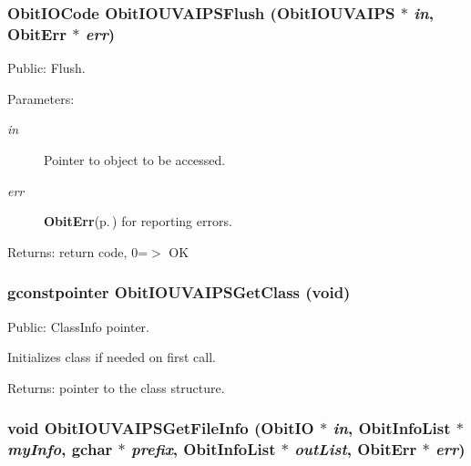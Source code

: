 \subsubsection{\setlength{\rightskip}{0pt plus 5cm}Obit\-IOCode Obit\-IOUVAIPSFlush ({\bf Obit\-IOUVAIPS} $\ast$ {\em in}, {\bf Obit\-Err} $\ast$ {\em err})}\label{ObitIOUVAIPS_8c_a28}


Public: Flush. 

\begin{Desc}
\item[Parameters:]
\begin{description}
\item[{\em in}]Pointer to object to be accessed. \item[{\em err}]{\bf Obit\-Err}{\rm (p.\,\pageref{structObitErr})} for reporting errors. \end{description}
\end{Desc}
\begin{Desc}
\item[Returns:]return code, 0=$>$ OK \end{Desc}
\subsubsection{\setlength{\rightskip}{0pt plus 5cm}gconstpointer Obit\-IOUVAIPSGet\-Class (void)}\label{ObitIOUVAIPS_8c_a11}


Public: Class\-Info pointer. 

Initializes class if needed on first call. \begin{Desc}
\item[Returns:]pointer to the class structure. \end{Desc}
\subsubsection{\setlength{\rightskip}{0pt plus 5cm}void Obit\-IOUVAIPSGet\-File\-Info ({\bf Obit\-IO} $\ast$ {\em in}, {\bf Obit\-Info\-List} $\ast$ {\em my\-Info}, gchar $\ast$ {\em prefix}, {\bf Obit\-Info\-List} $\ast$ {\em out\-List}, {\bf Obit\-Err} $\ast$ {\em err})}\label{ObitIOUVAIPS_8c_a32}


